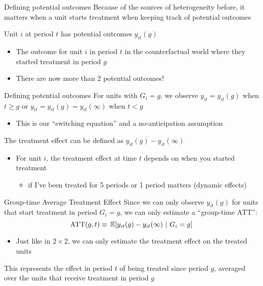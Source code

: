 \documentclass[aspectratio=169,t,11pt,table]{beamer}
\begin{document}
\begin{frame}{Defining potential outcomes}
  Because of the sources of heterogeneity before, it matters when a unit starts treatment when keeping track of potential outcomes
  
  \bigskip
  Unit $i$ at period $t$ has potential outcomes $y_{it}(g)$ 
  \begin{itemize}
    \item The outcome for unit $i$ in period $t$ in the counterfactual world where they started treatment in period $g$
    
    \item There are now more than $2$ potential outcomes!
  \end{itemize}
\end{frame}

\begin{frame}{Defining potential outcomes}
  For units with $G_i = g$, we observe $y_{it} = y_{it}(g)$ when $t \geq g$ or $y_{it} = y_{it}(g) = y_{it}(\infty)$ when $t < g$
  \begin{itemize}
    \item This is our ``switching equation'' and a no-anticipation assumption
  \end{itemize}

  \pause
  \bigskip
  The treatment effect can be defined as $y_{it}(g) - y_{it}(\infty)$
  \begin{itemize}
    \item For unit $i$, the treatment effect at time $t$ depends on when you started treatment
    \begin{itemize}
      \item if I've been treated for 5 periods or 1 period matters (dynamic effects)
    \end{itemize}
  \end{itemize}
\end{frame}

\begin{frame}{Group-time Average Treatment Effect}
  Since we can only observe $y_{it}(g)$ for units that start treatment in period $G_i = g$, we can only estimate a ``group-time ATT'':
  $$
    \text{ATT}(g, t) \equiv \expec{y_{it}(g) - y_{it}(\infty)}{G_i = g}
  $$

  \begin{itemize}
    \item Just like in $2 \times 2$, we can only estimate the treatment effect on the treated units
  \end{itemize}

  \bigskip
  This represents the effect in period $t$ of being treated since period $g$, averaged over the units that receive treatment in period $g$
\end{frame}
\end{document}
